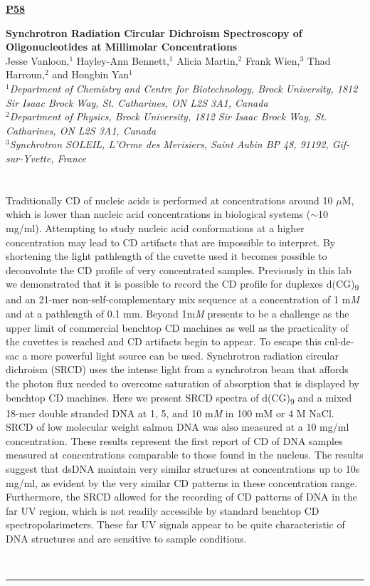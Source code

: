 \documentclass[titlepage,oneside,openany,10pt]{book}
\newenvironment{posterabs}[4] %
        {
	\begin{flushright}
                \underline{\textbf{#4}}
        \end{flushright}
        \textbf{#1}\\%
        #2\\%
        \textit{#3}\\\\%
        }
        {
        \\
        \noindent\rule{15cm}{0.5pt}%
        }
\begin{document}
\newpage

\begin{posterabs}
	{Synchrotron Radiation Circular Dichroism Spectroscopy of Oligonucleotides at Millimolar Concentrations}
	{Jesse Vanloon,$^{1}$ Hayley-Ann Bennett,$^{1}$ Alicia Martin,$^{2}$ Frank Wien,$^{3}$ Thad Harroun,$^{2}$ and Hongbin Yan$^{1}$}
	{
	$^1$Department of Chemistry and Centre for Biotechnology, Brock University, 1812 Sir Isaac Brock Way, St. Catharines, ON L2S 3A1, Canada \\
	$^2$Department of Physics, Brock University, 1812 Sir Isaac Brock Way, St. Catharines, ON L2S 3A1, Canada \\
	$^3$Synchrotron SOLEIL, L'Orme des Merisiers, Saint Aubin BP 48, 91192, Gif-sur-Yvette, France \\
	}
	{P58}
	Traditionally CD of nucleic acids is performed at concentrations around 10 $\mu$M, which is lower than nucleic acid concentrations in biological systems ($\sim$10 mg/ml). Attempting to study nucleic acid conformations at a higher concentration may lead to CD artifacts that are impossible to interpret. By shortening the light pathlength of the cuvette used it becomes possible to deconvolute the CD profile of very concentrated samples. Previously in this lab we demonstrated that it is possible to record the CD profile for duplexes d(CG)\textsubscript{9} and an 21-mer non-self-complementary mix sequence at a concentration of 1 m\emph{M} and at a pathlength of 0.1 mm. Beyond 1m\emph{M} presents to be a challenge as the upper limit of commercial benchtop CD machines as well as the practicality of the cuvettes is reached and CD artifacts begin to appear. To escape this cul-de-sac a more powerful light source can be used. Synchrotron radiation circular dichroism (SRCD) uses the intense light from a synchrotron beam that affords the photon flux needed to overcome saturation of absorption that is displayed by benchtop CD machines. Here we present SRCD spectra of d(CG)\textsubscript{9} and a mixed 18-mer double stranded DNA at 1, 5, and 10 m\emph{M} in 100 mM or 4 M NaCl. SRCD of low molecular weight salmon DNA was also measured at a 10 mg/ml concentration. These results represent the first report of CD of DNA samples measured at concentrations comparable to those found in the nucleus. The results suggest that dsDNA maintain very similar structures at concentrations up to 10s mg/ml, as evident by the very similar CD patterns in these concentration range. Furthermore, the SRCD allowed for the recording of CD patterns of DNA in the far UV region, which is not readily accessible by standard benchtop CD spectropolarimeters. These far UV signals appear to be quite characteristic of DNA structures and are sensitive to sample conditions.
	\label{VanloonJ}
\end{posterabs}
\end{document}
